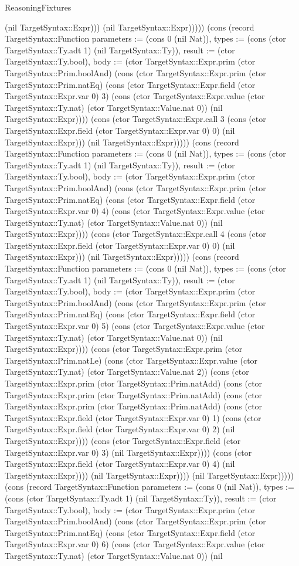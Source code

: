 \begin{lexlean}{ReasoningFixtures}
\begin{semanticmodule}
{(nil TargetSyntax::Expr))) (nil TargetSyntax::Expr))))}) (cons (record TargetSyntax::Function {parameters := (cons 0 (nil Nat)), types := (cons (ctor TargetSyntax::Ty.adt 1) (nil TargetSyntax::Ty)), result := (ctor TargetSyntax::Ty.bool), body := (ctor TargetSyntax::Expr.prim (ctor TargetSyntax::Prim.boolAnd) (cons (ctor TargetSyntax::Expr.prim (ctor TargetSyntax::Prim.natEq) (cons (ctor TargetSyntax::Expr.field (ctor TargetSyntax::Expr.var 0) 3) (cons (ctor TargetSyntax::Expr.value (ctor TargetSyntax::Ty.nat) (ctor TargetSyntax::Value.nat 0)) (nil TargetSyntax::Expr)))) (cons (ctor TargetSyntax::Expr.call 3 (cons (ctor TargetSyntax::Expr.field (ctor TargetSyntax::Expr.var 0) 0) (nil TargetSyntax::Expr))) (nil TargetSyntax::Expr))))}) (cons (record TargetSyntax::Function {parameters := (cons 0 (nil Nat)), types := (cons (ctor TargetSyntax::Ty.adt 1) (nil TargetSyntax::Ty)), result := (ctor TargetSyntax::Ty.bool), body := (ctor TargetSyntax::Expr.prim (ctor TargetSyntax::Prim.boolAnd) (cons (ctor TargetSyntax::Expr.prim (ctor TargetSyntax::Prim.natEq) (cons (ctor TargetSyntax::Expr.field (ctor TargetSyntax::Expr.var 0) 4) (cons (ctor TargetSyntax::Expr.value (ctor TargetSyntax::Ty.nat) (ctor TargetSyntax::Value.nat 0)) (nil TargetSyntax::Expr)))) (cons (ctor TargetSyntax::Expr.call 4 (cons (ctor TargetSyntax::Expr.field (ctor TargetSyntax::Expr.var 0) 0) (nil TargetSyntax::Expr))) (nil TargetSyntax::Expr))))}) (cons (record TargetSyntax::Function {parameters := (cons 0 (nil Nat)), types := (cons (ctor TargetSyntax::Ty.adt 1) (nil TargetSyntax::Ty)), result := (ctor TargetSyntax::Ty.bool), body := (ctor TargetSyntax::Expr.prim (ctor TargetSyntax::Prim.boolAnd) (cons (ctor TargetSyntax::Expr.prim (ctor TargetSyntax::Prim.natEq) (cons (ctor TargetSyntax::Expr.field (ctor TargetSyntax::Expr.var 0) 5) (cons (ctor TargetSyntax::Expr.value (ctor TargetSyntax::Ty.nat) (ctor TargetSyntax::Value.nat 0)) (nil TargetSyntax::Expr)))) (cons (ctor TargetSyntax::Expr.prim (ctor TargetSyntax::Prim.natLe) (cons (ctor TargetSyntax::Expr.value (ctor TargetSyntax::Ty.nat) (ctor TargetSyntax::Value.nat 2)) (cons (ctor TargetSyntax::Expr.prim (ctor TargetSyntax::Prim.natAdd) (cons (ctor TargetSyntax::Expr.prim (ctor TargetSyntax::Prim.natAdd) (cons (ctor TargetSyntax::Expr.prim (ctor TargetSyntax::Prim.natAdd) (cons (ctor TargetSyntax::Expr.field (ctor TargetSyntax::Expr.var 0) 1) (cons (ctor TargetSyntax::Expr.field (ctor TargetSyntax::Expr.var 0) 2) (nil TargetSyntax::Expr)))) (cons (ctor TargetSyntax::Expr.field (ctor TargetSyntax::Expr.var 0) 3) (nil TargetSyntax::Expr)))) (cons (ctor TargetSyntax::Expr.field (ctor TargetSyntax::Expr.var 0) 4) (nil TargetSyntax::Expr)))) (nil TargetSyntax::Expr)))) (nil TargetSyntax::Expr))))}) (cons (record TargetSyntax::Function {parameters := (cons 0 (nil Nat)), types := (cons (ctor TargetSyntax::Ty.adt 1) (nil TargetSyntax::Ty)), result := (ctor TargetSyntax::Ty.bool), body := (ctor TargetSyntax::Expr.prim (ctor TargetSyntax::Prim.boolAnd) (cons (ctor TargetSyntax::Expr.prim (ctor TargetSyntax::Prim.natEq) (cons (ctor TargetSyntax::Expr.field (ctor TargetSyntax::Expr.var 0) 6) (cons (ctor TargetSyntax::Expr.value (ctor TargetSyntax::Ty.nat) (ctor TargetSyntax::Value.nat 0)) (nil }
\end{semanticmodule}
\end{lexlean}
